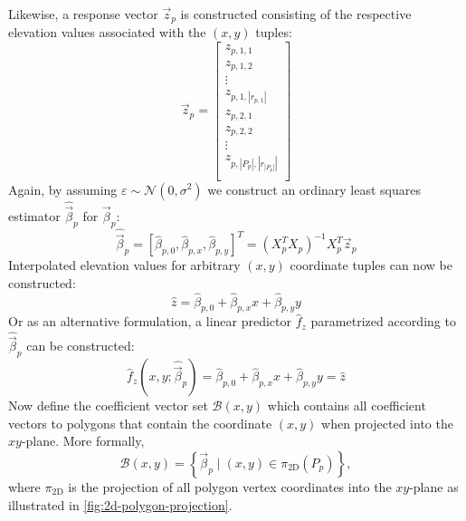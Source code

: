 %
Likewise, a response vector $\vec{z}_p$ is constructed consisting of the respective elevation values associated with the $(x, y)$ tuples:
%
\begin{equation*}
  \vec{z}_p
  =
  \begin{bmatrix}
     z_{p,1,1} \\
     z_{p,1,2} \\
     \vdots \\
     z_{p,1,|r_{p,1}|} \\
     z_{p,2,1} \\
     z_{p,2,2} \\
     \vdots \\
     z_{p,|P_p|,|r_{|P_p|}|} \\
  \end{bmatrix}
\end{equation*}
%
Again, by assuming $\varepsilon \sim \mathcal{N}(0, \sigma^2)$ we construct an ordinary least squares estimator $\widehat{\vec{\beta}}_p $ for $\vec{\beta}_p$:
%
\begin{equation*}
  \widehat{\vec{\beta}}_p
  =
  {\left[
    \widehat{\beta}_{p,0},
    \widehat{\beta}_{p,x},
    \widehat{\beta}_{p,y}
  \right]}^T
  =
  \left( X_p^T X_p \right)^{-1} X_p^T \vec{z}_p
\end{equation*}
%
Interpolated elevation values for arbitrary $(x, y)$ coordinate tuples can now be constructed:
%
\begin{equation*}
  \widehat{z} = \widehat{\beta}_{p,0} + \widehat{\beta}_{p,x} x + \widehat{\beta}_{p,y} y
\end{equation*}
%
Or as an alternative formulation, a linear predictor $\widehat{f}_z$ parametrized according to $\widehat{\vec{\beta}}_p$ can be constructed:
%
\begin{equation*}
  \widehat{f}_z\left(x, y; \widehat{\vec{\beta}}_p\right)
  =
    \widehat{\beta}_{p,0}
    + \widehat{\beta}_{p,x} x
    + \widehat{\beta}_{p,y} y
  =
  \widehat{z}
\end{equation*}
%
Now define the coefficient vector set $\mathcal{B}(x, y)$ which contains all coefficient vectors to polygons that contain the coordinate $(x, y)$ when projected into the $xy$-plane.
More formally,
%
\begin{equation*}
  \mathcal{B}(x, y) = \left\{
    \vec{\beta}_p
    \mid
    (x, y) \in \pi_{\mathrm{2D}}(P_p)
  \right\},
\end{equation*}
%
where $\pi_{\mathrm{2D}}$ is the projection of all polygon vertex coordinates into the $xy$-plane as illustrated in \cref{fig:2d-polygon-projection}.
